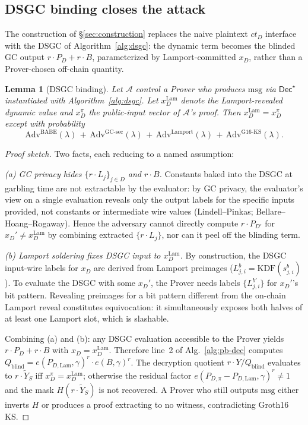 \documentclass[11pt]{article}
\newtheorem{lemma}{Lemma}
\newcommand{\msg}{\mathrm{msg}}
\newcommand{\Dec}{\mathsf{Dec}}
\newcommand{\Adv}{\mathrm{Adv}}
\begin{document}
\subsection{DSGC binding closes the attack}

The construction of \S\ref{sec:construction} replaces the naive
plaintext $ct_D$ interface with the DSGC of
Algorithm~\ref{alg:dsgc}: the dynamic term becomes the blinded GC
output $r \cdot P_D + r \cdot B$, parameterized by Lamport-committed
$x_D$, rather than a Prover-chosen off-chain quantity.

\begin{lemma}[DSGC binding]\label{lem:dsgc-binding}
Let $\mathcal{A}$ control a Prover who produces $\msg$ via
$\Dec^\star$ instantiated with Algorithm~\ref{alg:dsgc}. Let
$x_D^{\mathrm{Lam}}$ denote the Lamport-revealed dynamic value and
$x_D^{\pi}$ the public-input vector of $\mathcal{A}$'s proof.
Then $x_D^{\mathrm{Lam}} = x_D^{\pi}$ except with probability
\[
  \Adv^{\mathrm{BABE}}(\lambda) \,+\, \Adv^{\mathrm{GC\text{-}sec}}(\lambda)
  \,+\, \Adv^{\mathrm{Lamport}}(\lambda) \,+\, \Adv^{\mathrm{G16\text{-}KS}}(\lambda).
\]
\end{lemma}

\begin{proof}[Proof sketch]
Two facts, each reducing to a named assumption:

\emph{(a) GC privacy hides $\{r \cdot L_j\}_{j \in D}$ and $r \cdot B$.} Constants
baked into the DSGC at garbling time are not extractable by the
evaluator: by GC privacy, the evaluator's view on a single
evaluation reveals only the output labels for the specific inputs
provided, not constants or intermediate wire values
(Lindell--Pinkas; Bellare--Hoang--Rogaway). Hence the adversary
cannot directly compute $r \cdot P_{D'}$ for
$x_D' \neq x_D^{\mathrm{Lam}}$ by combining extracted
$\{r \cdot L_j\}$, nor can it peel off the blinding term.

\emph{(b) Lamport soldering fixes DSGC input to $x_D^{\mathrm{Lam}}$.}
By construction, the DSGC input-wire labels for $x_D$ are derived
from Lamport preimages ($L_{j,i}^b = \mathrm{KDF}(s_{j,i}^b)$). To
evaluate the DSGC with some $x_D'$, the Prover needs labels
$\{L_{j,i}^{b'}\}$ for $x_D'$'s bit pattern. Revealing preimages for
a bit pattern different from the on-chain Lamport reveal constitutes
equivocation: it simultaneously exposes both halves of at least one
Lamport slot, which is slashable.

Combining (a) and (b): any DSGC evaluation accessible to the Prover
yields $r \cdot P_D + r \cdot B$ with
$x_D = x_D^{\mathrm{Lam}}$. Therefore line~2 of
Alg.~\ref{alg:pb-dec} computes
$Q_{\mathrm{blind}} = e(P_{D, \mathrm{Lam}}, \gamma)^r \cdot e(B, \gamma)^r$.
The decryption quotient $r \cdot Y / Q_{\mathrm{blind}}$ evaluates
to $r \cdot \widetilde{Y}_S$ iff
$x_D^{\pi} = x_D^{\mathrm{Lam}}$; otherwise the residual factor
$e(P_{D, \pi} - P_{D, \mathrm{Lam}}, \gamma)^r \neq 1$ and the mask
$H(r \cdot \widetilde{Y}_S)$ is not recovered. A Prover who still outputs $\msg$
either inverts $H$ or produces a proof extracting to no witness,
contradicting Groth16 KS.
\end{proof}
\end{document}
